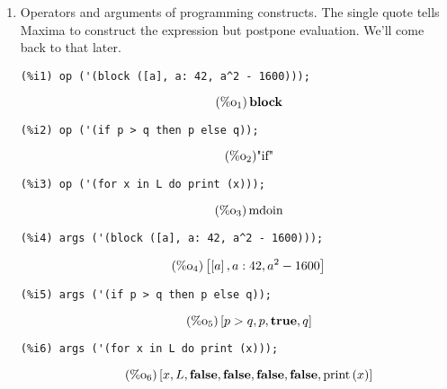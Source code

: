 \documentclass[12pt,leqno]{article}
\begin{document}
\begin{enumerate}
\item Operators and arguments of programming constructs.
The single quote tells Maxima to construct the expression but postpone evaluation.
We'll come back to that later.
\begin{verbatim}
(%i1) op ('(block ([a], a: 42, a^2 - 1600)));
\end{verbatim}
\begin{equation}
\tag{$\mathop{\mathrm{\%o}}_{1}$}\mathop{\mathbf{block}}
\label{eq:doc-group1-code11-1-1}
\end{equation}
\begin{verbatim}
(%i2) op ('(if p > q then p else q));
\end{verbatim}
\begin{equation}
\tag{$\mathop{\mathrm{\%o}}_{2}$}\mbox{"if"}
\label{eq:doc-group1-code11-2-1}
\end{equation}
\begin{verbatim}
(%i3) op ('(for x in L do print (x)));
\end{verbatim}
\begin{equation}
\tag{$\mathop{\mathrm{\%o}}_{3}$}\mathop{\mathrm{mdoin}}
\label{eq:doc-group1-code11-3-1}
\end{equation}
\begin{verbatim}
(%i4) args ('(block ([a], a: 42, a^2 - 1600)));
\end{verbatim}
\begin{equation}
\tag{$\mathop{\mathrm{\%o}}_{4}$}\left[\left[a\right], a : 42, {a}^{2}-1600\right]
\label{eq:doc-group1-code11-4-1}
\end{equation}
\begin{verbatim}
(%i5) args ('(if p > q then p else q));
\end{verbatim}
\begin{equation}
\tag{$\mathop{\mathrm{\%o}}_{5}$}\left[p > q, p, \mathop{\mathbf{true}}, q\right]
\label{eq:doc-group1-code11-5-1}
\end{equation}
\begin{verbatim}
(%i6) args ('(for x in L do print (x)));
\end{verbatim}
\begin{equation}
\tag{$\mathop{\mathrm{\%o}}_{6}$}\left[x, L, \mathop{\mathbf{false}}, \mathop{\mathbf{false}}, \mathop{\mathbf{false}}, \mathop{\mathbf{false}}, \mathop{\mathrm{print}}\left(x\right)\right]
\label{eq:doc-group1-code11-6-1}
\end{equation}


\end{enumerate}
\end{document}
